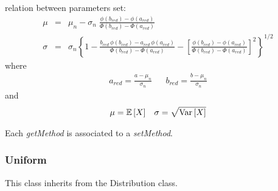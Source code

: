 \begin{description}
\begin{description}
\item relation between parameters set:
\begin{eqnarray*}
\mu                                       &       =       &   \mu_n -
\sigma_n \;
\frac{\phi(b_{red}) - \phi(a_{red})}
{\Phi(b_{red}) - \Phi(a_{red})}   \\
\sigma            &  =    &       \sigma_n
\left\{
1
-
\frac{b_{red}\,\phi(b_{red}) - a_{red}\,\phi(a_{red})}
{\Phi(b_{red}) - \Phi(a_{red})}
-
\left[
\frac{\phi(b_{red}) - \phi(a_{red})}
{\Phi(b_{red}) - \Phi(a_{red})}
\right]^2
\right\}^{1/2}
\end{eqnarray*}
where
\begin{eqnarray*}
a_{red} = \frac{a - \mu_n}{\sigma_n} &&
b_{red} = \frac{b - \mu_n}{\sigma_n}
\end{eqnarray*}
and
\begin{align*}
\mu = {\mathbb E}\left[ X \right]
&&
\sigma = \sqrt{{\rm Var}\left[ X \right] }
\end{align*}
\end{description}

\item[Links:]  \rule{0pt}{1em}
\end{description}




Each  \textit{getMethod}  is associated to a \textit{setMethod}.

\newpage
\subsubsection{Uniform}

This class inherits from the Distribution class.

